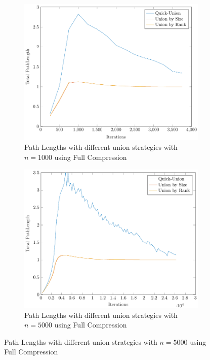 \begin{figure}[ht]
    \centering
    \begin{subfigure}{0.32\textwidth}
        \centering
        \includegraphics[width=\textwidth]{../images/plotFCFull1000_PathLength.pdf}
        \caption{Path Lengths with different union strategies with $n = 1000$ using Full Compression}
    \end{subfigure}%
    \hfill
    \begin{subfigure}{0.32\textwidth}
        \centering
        \includegraphics[width=\textwidth]{../images/plotFCFull5000_PathLength.pdf}
        \caption{Path Lengths with different union strategies with $n = 5000$ using Full Compression}

\end{subfigure}
\end{figure}
